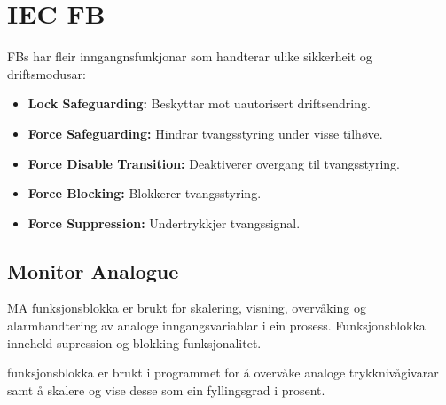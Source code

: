 \section{IEC \gls{FB}}
\thispagestyle{fancy}



\glspl{FB} har fleir inngangnsfunkjonar som handterar ulike sikkerheit og driftsmodusar:
\begin{itemize}
    \item \textbf{Lock Safeguarding:} Beskyttar mot uautorisert driftsendring.
    \item \textbf{Force Safeguarding:} Hindrar tvangsstyring under visse tilhøve.
    \item \textbf{Force Disable Transition:} Deaktiverer overgang til tvangsstyring.
    \item \textbf{Force Blocking:} Blokkerer tvangsstyring.
    \item \textbf{Force Suppression:} Undertrykkjer tvangssignal.
\end{itemize}


\subsection{Monitor Analogue}
\gls{MA} funksjonsblokka er brukt for skalering, visning, overvåking og alarmhandtering av analoge inngangsvariablar i ein prosess.
Funksjonsblokka inneheld supression og blokking funksjonalitet.

funksjonsblokka er brukt i programmet for å overvåke analoge trykknivågivarar samt å skalere og vise desse som ein fyllingsgrad i prosent.

